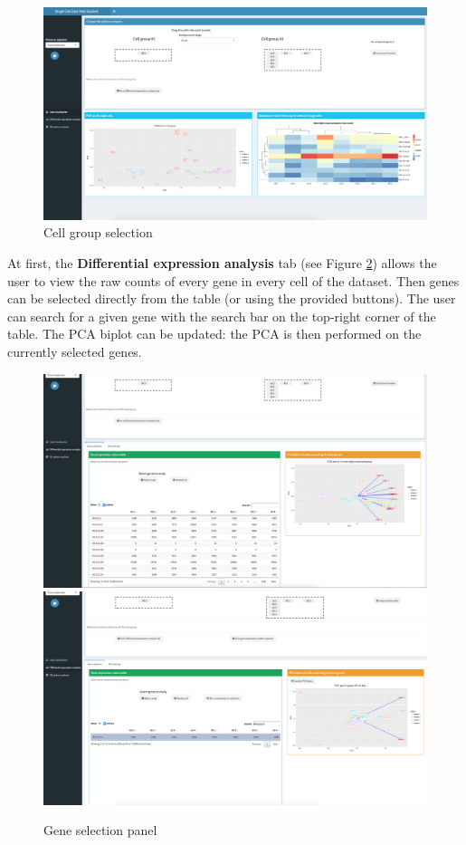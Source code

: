 \documentclass{report}
\begin{document}
{\begin{figure}[H]
\centering
\includegraphics[scale=0.2]{application/cellselection.png}
\caption{Cell group selection}
\label{cellselection}
\end{figure}

At first, the \textbf{Differential expression analysis} tab (see Figure \ref{geneselection}) allows the user to view the raw counts of every gene in every cell of the dataset. Then genes can be selected directly from the table (or using the provided buttons). The user can search for a given gene with the search bar on the top-right corner of the table. The PCA biplot can be updated: the PCA is then performed on the currently selected genes.\\

\begin{figure}[H]
\centering
\subfigure\includegraphics[scale=0.2]{application/geneselection.png}
\subfigure\includegraphics[scale=0.2]{application/geneselected.png}
\caption{Gene selection panel}
\label{geneselection}
\end{figure}

}
\end{document}
